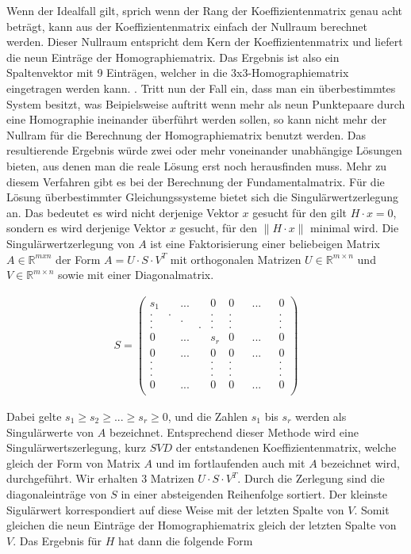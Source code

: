 Wenn der Idealfall gilt, sprich wenn der Rang der Koeffizientenmatrix genau acht beträgt, kann aus der Koeffizientenmatrix einfach der Nullraum berechnet werden. Dieser Nullraum entspricht dem Kern der Koeffizientenmatrix und liefert die neun Einträge der Homographiematrix. Das Ergebnis ist also ein Spaltenvektor mit 9 Einträgen, welcher in die 3x3-Homographiematrix eingetragen werden kann. \cite{HZ}\cite{Schwarz}. Tritt nun der Fall ein, dass man ein überbestimmtes System besitzt, was Beipielsweise auftritt wenn mehr als neun Punktepaare durch eine Homographie ineinander überführt werden sollen, so kann nicht mehr der Nullram für die Berechnung der Homographiematrix benutzt werden. Das resultierende Ergebnis würde zwei oder mehr voneinander unabhängige Lösungen bieten, aus denen man die reale Lösung erst noch herausfinden muss. Mehr zu diesem Verfahren gibt es bei der Berechnung der Fundamentalmatrix.\cite{HZ} Für die Lösung überbestimmter Gleichungssysteme bietet sich die Singulärwertzerlegung an\cite{HZ}\cite{Scholz}. Das bedeutet es wird nicht derjenige Vektor $x$ gesucht für den gilt $H \cdot x = 0$, sondern es wird derjenige Vektor $x$ gesucht, für den \ensuremath{\parallel H \cdot x\parallel} minimal wird\cite{HZ}. Die Singulärwertzerlegung von $A$ ist eine Faktorisierung einer beliebeigen Matrix \ensuremath{A \in \mathbb{R}^{mxn}} der Form \ensuremath{A = U \cdot S \cdot V^T} mit orthogonalen Matrizen \ensuremath{U \in \mathbb{R}^{m \times n}} und \ensuremath{V \in \mathbb{R}^{m \times n}} sowie mit einer Diagonalmatrix. 

\begin{gather}
	S = \begin{pmatrix}
	s_1&&...&&0&0&&...&&0\\
	.&.&&&.&.&&&&.\\
	.&&.&&.&.&&&&.\\
	.&&&.&.&.&&&&.\\
	0&&...&&s_r&0&&...&&0\\	
	0&&...&&0&0&&...&&0\\
	.&&&&.&.&&&&.\\
	.&&&&.&.&&&&.\\	
	.&&&&.&.&&&&.\\	
	0&&...&&0&0&&...&&0\\	
	\end{pmatrix}
\end{gather}

Dabei gelte \ensuremath{s_1 \geq s_2 \geq ... \geq s_r \ge 0 }, und die Zahlen $s_1$ bis $s_r$ werden als Singulärwerte von $A$ bezeichnet\cite{Scholz}. Entsprechend dieser Methode wird eine Singulärwertszerlegung, kurz $SVD$ der entstandenen Koeffizientenmatrix, welche gleich der Form von Matrix $A$ und im fortlaufenden auch mit $A$ bezeichnet wird, durchgeführt. Wir erhalten 3 Matrizen $U \cdot S\cdot V^T$. Durch die Zerlegung sind die diagonaleinträge von $S$ in einer absteigenden Reihenfolge sortiert. Der kleinste Sigulärwert korrespondiert auf diese Weise mit der letzten Spalte von $V$. Somit gleichen die neun Einträge der Homographiematrix gleich der letzten Spalte von $V$. Das Ergebnis für $H$ hat dann die folgende Form

